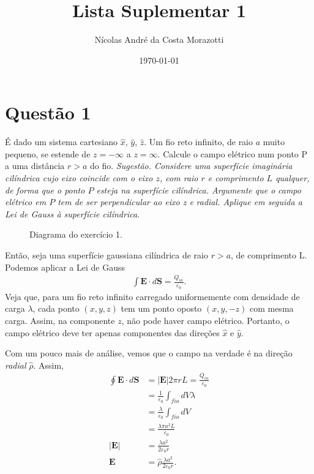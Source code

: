 \documentclass[11pt]{article}
\author{Nícolas André da Costa Morazotti}
\date{\today}
\title{Lista Suplementar 1}
\begin{document}
\maketitle
\section{Questão 1}
\label{sec:org3781183}
É dado um sistema cartesiano \(\hat x\), \(\hat y\), \(\hat z\). Um fio reto
infinito, de raio \(a\) muito pequeno, se estende de \(z=-\infty\) a
\(z=\infty\). Calcule o campo elétrico num ponto P a uma distância \(r>a\) do
fio. \emph{Sugestão. Considere uma superfície imaginária cilíndrica cujo}
\emph{eixo coincide com o eixo \(z\), com raio \(r\) e comprimento \(L\) qualquer,}
\emph{de forma que o ponto \(P\) esteja na superfície cilíndrica. Argumente que o}
\emph{campo elétrico em \(P\) tem de ser perpendicular ao eixo z e}
\emph{radial. Aplique em seguida a Lei de Gauss à superfície cilíndrica.}

\begin{figure}[h!]
  \centering
  \caption{Diagrama do exercício 1.}
  \label{fig:ex-1}
\end{figure}

Então, seja uma superfície gaussiana cilíndrica de raio \(r>a\), de
comprimento L. Podemos aplicar a Lei de Gauss
\begin{align*}
  \int \mathbf{E}\cdot d\mathbf{S} = \frac{Q_{in}}{\varepsilon_0}.
\end{align*}
Veja que, para um fio reto infinito carregado uniformemente com
densidade de carga \(\lambda\), cada ponto \((x,y,z)\) tem um ponto oposto
\((x,y,-z)\) com mesma carga. Assim, na componente \(z\), não pode haver
campo elétrico. Portanto, o campo elétrico deve ter apenas componentes
das direções \(\hat x\) e \(\hat y\).

Com um pouco mais de análise, vemos que o campo na verdade é na direção
\emph{radial} \(\hat\rho\). Assim,
\begin{align}
  \label{eq:1}
  \oint\mathbf E\cdot d\mathbf S &= |\mathbf E| 2\pi rL = \frac{Q_{in}}{\varepsilon_0}\\
                         &= \frac 1{\varepsilon_0}\int_{fio} dV \lambda\\
                         &= \frac {\lambda}{\varepsilon_0}\int_{fio} dV\\
                         &= \frac{\lambda\pi a^2L}{\varepsilon_0}\\
  |\mathbf E| &= \frac{\lambda a^2}{2\varepsilon_0 r}\\
  \mathbf E &= \hat\rho\frac{\lambda a^2}{2\varepsilon_0 r}.
\end{align}
\end{document}
